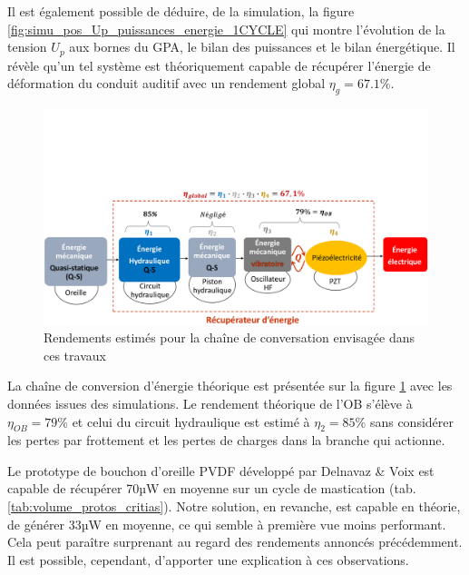 Il est également possible de déduire, de la simulation, la figure \ref{fig:simu_pos_Up_puissances_energie_1CYCLE} qui montre l'évolution de la tension $U_p$ aux bornes du GPA, le bilan des puissances et le bilan énergétique. Il révèle qu'un tel système est théoriquement capable de récupérer l'énergie de déformation du conduit auditif avec un rendement global $\eta_g = 67.1\%$. 
\begin{figure}[!htbp]
	\begin{center}
		\captionsetup{justification=centering}
		\includegraphics[trim={0cm 0cm 0cm 7cm},clip,width=\textwidth]{../Chap2/Figure/conversion_symme_rendements.pdf}
		\caption{Rendements estimés pour la chaîne de conversation envisagée dans ces travaux}
		\label{fig:conversion_symme_rendements_theoriques}
	\end{center}
\end{figure}

La chaîne de conversion d'énergie théorique est présentée sur la figure \ref{fig:conversion_symme_rendements_theoriques} avec les données issues des simulations. Le rendement théorique de l'OB s'élève à $\eta_{OB} = 79$\% et celui du circuit hydraulique est estimé à $\eta_2 = 85$\% sans considérer les pertes par frottement et les pertes de charges dans la branche qui actionne.

Le prototype de bouchon d'oreille PVDF développé par Delnavaz \& Voix est capable de récupérer 70µW en moyenne sur un cycle de mastication (tab. \ref{tab:volume_protos_critias}). Notre solution, en revanche, est capable en théorie, de générer 33µW en moyenne, ce qui semble à première vue moins performant. Cela peut paraître surprenant au regard des rendements annoncés précédemment. Il est possible, cependant, d'apporter une explication à ces observations.

